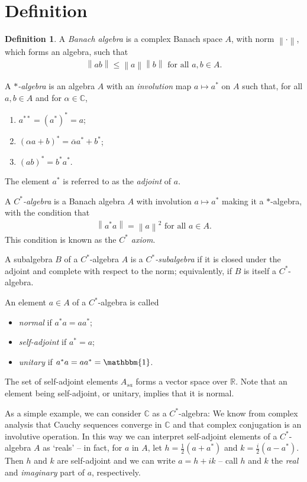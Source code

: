 \documentclass[11pt,a4paper]{report}
\theoremstyle{plain}
\theoremstyle{definition}
\newtheorem{defn}{Definition}
\newcommand{\1}{\mathbbm{1}}
\newcommand{\C}{\mathbb{C}}
\newcommand{\R}{\mathbb{R}}
\begin{document}
\section{Definition}
\begin{defn}
	A \emph{Banach algebra} is a complex Banach space $A$, with norm $\left\|\cdot\right\|$, which forms an 
	algebra, such that 
	\begin{align*}
		\left\|ab\right\| \leq \left\|a\right\| \left\|b\right\| \mbox{ for all } a,b \in A.
	\end{align*}
	
	A \emph{$\ast$-algebra} is an algebra $A$ with an \emph{involution} map 
	$a \mapsto a^\ast$ on $A$ such that, for all $a,b \in A$ and for $\alpha \in \C$,
	\begin{enumerate}
		\item $a^{\ast\ast} = (a^\ast)^\ast = a$;
		\item $(\alpha a+b)^\ast = \overline{\alpha} a^\ast + b^\ast$;
		\item $(ab)^\ast = b^\ast a^\ast$.
	\end{enumerate}
	The element $a^\ast$ is referred to as the \emph{adjoint} of $a$. 
	
	A \emph{$C^\ast$-algebra} is a Banach algebra $A$ with involution $a \mapsto a^\ast$ making it a 
	$\ast$-algebra, with the condition that
	\begin{align*}
		\left\|a ^\ast a\right\| = \left\|a\right\|^2 \mbox{ for all } a \in A.
	\end{align*}
	This condition is known as the \emph{$C^\ast$ axiom}.
	
	A subalgebra $B$ of a $C^\ast$-algebra $A$ is a \emph{$C^\ast$-subalgebra} if it is closed under the 
	adjoint and complete with respect to the norm; equivalently, if $B$ is itself a $C^\ast$-algebra.
	
	An element $a\in A$ of a $C^\ast$-algebra is called
	\begin{itemize}
		\item	\emph{normal} if $a^\ast a=aa^\ast$;
		\item 	\emph{self-adjoint} if $a^\ast=a$;
		\item 	\emph{unitary} if $a^\ast a = aa^\ast =\1$. 
	\end{itemize}
\end{defn}
The set of self-adjoint elements $A_{sa}$ forms a vector space over $\R$.
Note that an element being self-adjoint, or unitary, implies that it is normal.

As a simple example, we can consider $\C$ as a $C^\ast$-algebra: We know from complex analysis that 
Cauchy sequences converge in $\C$ and that complex conjugation is an involutive operation. In this way 
we can interpret self-adjoint elements of a $C^\ast$-algebra $A$ as `reals' -- in fact, for $a$ in $A$, 
let $h=\tfrac{1}{2}(a+a^\ast)$ and $k=\tfrac{i}{2}(a-a^\ast)$. Then $h$ and $k$ are self-adjoint and we 
can write $a=h+ik$ -- call $h$ and $k$ the \emph{real} and \emph{imaginary} part of $a$, respectively. 
\end{document}
